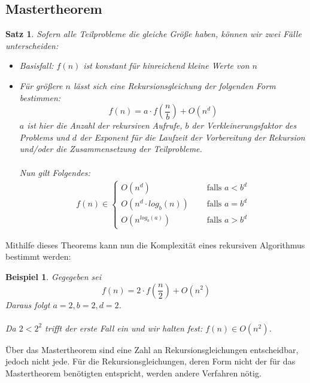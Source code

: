 \documentclass[11pt,a4paper]{scrartcl}
\newtheorem{satz}{Satz}
\newtheorem{example}{Beispiel}
\begin{document}
\subsection{Mastertheorem}
\begin{satz} Sofern alle Teilprobleme die gleiche Größe haben, können wir zwei Fälle unterscheiden: 
\begin{itemize}
\item Basisfall: $f(n)$ ist konstant für hinreichend kleine Werte von $n$
\item Für größere $n$ lässt sich eine Rekursionsgleichung der folgenden Form bestimmen: 
\[f(n) = a \cdot f(\frac{n}{b}) + O(n^{d})\]
$a$ ist hier die Anzahl der rekursiven Aufrufe, $b$ der Verkleinerungsfaktor des Problems und $d$ der Exponent für die Laufzeit der Vorbereitung der Rekursion und/oder die Zusammensetzung der Teilprobleme. \\\\
Nun gilt Folgendes: \\
\begin{align*}
f(n) \in 
\begin{cases}
O(n^{d}) \quad & \text{ falls } a < b^{d} \\
O(n^{d} \cdot log_{b}(n)) \quad & \text{ falls } a = b^{d} \\
O(n^{log_{b}(a)}) \quad & \text{ falls } a > b^{d}
\end{cases}
\end{align*}
\end{itemize}
\end{satz}
Mithilfe dieses Theorems kann nun die Komplexität eines rekursiven Algorithmus bestimmt werden:
\begin{example}
Gegegeben sei \[f(n) = 2 \cdot f(\frac{n}{2}) + O(n^{2})\] 
Daraus folgt $ a = 2, b = 2, d = 2$. \\\\
Da $2 < 2^{2}$ trifft der erste Fall ein und wir halten fest: $f(n) \in O(n^{2})$.
\end{example}
Über das Mastertheorem sind eine Zahl an Rekursionsgleichungen entscheidbar, jedoch nicht jede. Für die Rekursionsgleichungen, deren Form nicht der für das Mastertheorem benötigten entspricht, werden andere Verfahren nötig.
\end{document}
